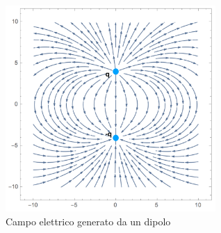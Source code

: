  
\begin{figure}[!ht]
\vspace{0.1in}
\includegraphics[width = 8cm]{images/dipol1}	
\centering
\caption{Campo elettrico generato da un dipolo}
\end{figure}












